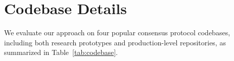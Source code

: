 \documentclass{article}
\theoremstyle{plain}
\theoremstyle{definition}
\theoremstyle{remark}
\newcommand{\consensustester}{Agora\xspace}
\begin{document}
\section{Codebase Details}
\label{appendsec:codebase}
We evaluate our approach on four popular consensus protocol codebases, including both research prototypes and production-level repositories, as summarized in Table~\ref{tab:codebase}.





\end{document}
